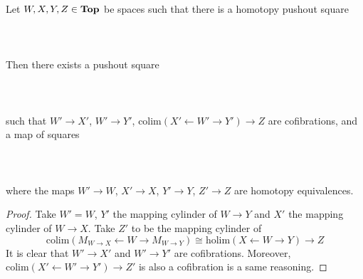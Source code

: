 \begin{prp}\label{prp:CofibRepHpush} Let $W,X,Y,Z\in\bold{Top}$ be spaces such that there is a homotopy pushout square  
 \\~\\  \\~\\
Then there exists a pushout square  
 \\~\\  \\~\\
such that $W'\to X'$, $W'\to Y'$, $\text{colim}(X'\leftarrow W'\rightarrow Y')\to Z$ are cofibrations, and a map of squares  
 \\~\\  \\~\\
where the maps $W'\to W$, $X'\to X$, $Y'\to Y$, $Z'\to Z$ are homotopy equivalences. 
\begin{proof}
Take $W'=W$, $Y'$ the mapping cylinder of $W\to Y$ and $X'$ the mapping cylinder of $W\to X$. Take $Z'$ to be the mapping cylinder of $$\text{colim}(M_{W\to X}\leftarrow W\rightarrow M_{W\to Y})\cong\text{holim}(X\leftarrow W\rightarrow Y)\to Z$$ It is clear that $W'\to X'$ and $W'\to Y'$ are cofibrations. Moreover, $\text{colim}(X'\leftarrow W'\rightarrow Y')\to Z'$ is also a cofibration is a same reasoning. 
\end{proof}
\end{prp}

